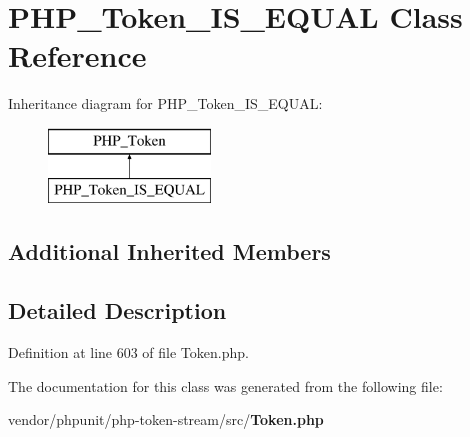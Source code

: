 \section{P\+H\+P\+\_\+\+Token\+\_\+\+I\+S\+\_\+\+E\+Q\+U\+A\+L Class Reference}
\label{class_p_h_p___token___i_s___e_q_u_a_l}
Inheritance diagram for P\+H\+P\+\_\+\+Token\+\_\+\+I\+S\+\_\+\+E\+Q\+U\+A\+L\+:\begin{figure}[H]
\begin{center}
\leavevmode
\includegraphics[height=2.000000cm]{class_p_h_p___token___i_s___e_q_u_a_l}
\end{center}
\end{figure}
\subsection*{Additional Inherited Members}


\subsection{Detailed Description}


Definition at line 603 of file Token.\+php.



The documentation for this class was generated from the following file\+:\begin{DoxyCompactItemize}
\item 
vendor/phpunit/php-\/token-\/stream/src/{\bf Token.\+php}\end{DoxyCompactItemize}

